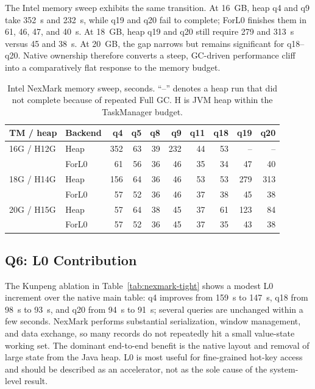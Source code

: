\documentclass[sigconf]{acmart}
\newcommand{\forlzero}{ForL0\xspace}
\newcommand{\system}{\forlzero}
\begin{document}
The Intel memory sweep exhibits the same transition. At 16~GB, heap q4 and q9 take 352~s and 232~s, while q19 and q20 fail to complete; \system finishes them in 61, 46, 47, and 40~s. At 18~GB, heap q19 and q20 still require 279 and 313~s versus 45 and 38~s. At 20~GB, the gap narrows but remains significant for q18--q20. Native ownership therefore converts a steep, GC-driven performance cliff into a comparatively flat response to the memory budget.

\begin{table}[t]
\caption{Intel NexMark memory sweep, seconds. ``--'' denotes a heap run that did not complete because of repeated Full GC. H is JVM heap within the TaskManager budget.}
\label{tab:nexmark-sweep}
\centering
\small
\setlength{\tabcolsep}{4.0pt}
\begin{tabular}{llrrrrrrrr}
\toprule
TM / heap & Backend & q4 & q5 & q8 & q9 & q11 & q18 & q19 & q20 \\
\midrule
16G / H12G & Heap & 352 & 63 & 39 & 232 & 44 & 53 & -- & -- \\
             & \system & 61 & 56 & 36 & 46 & 35 & 34 & 47 & 40 \\
\midrule
18G / H14G & Heap & 156 & 64 & 36 & 46 & 53 & 53 & 279 & 313 \\
             & \system & 57 & 52 & 36 & 46 & 37 & 38 & 45 & 38 \\
\midrule
20G / H15G & Heap & 57 & 64 & 38 & 45 & 37 & 61 & 123 & 84 \\
             & \system & 57 & 52 & 36 & 45 & 37 & 35 & 43 & 38 \\
\bottomrule
\end{tabular}
\end{table}

\subsection{Q6: L0 Contribution}

The Kunpeng ablation in Table~\ref{tab:nexmark-tight} shows a modest L0 increment over the native main table: q4 improves from 159~s to 147~s, q18 from 98~s to 93~s, and q20 from 94~s to 91~s; several queries are unchanged within a few seconds. NexMark performs substantial serialization, window management, and data exchange, so many records do not repeatedly hit a small value-state working set. The dominant end-to-end benefit is the native layout and removal of large state from the Java heap. L0 is most useful for fine-grained hot-key access and should be described as an accelerator, not as the sole cause of the system-level result.
\end{document}
